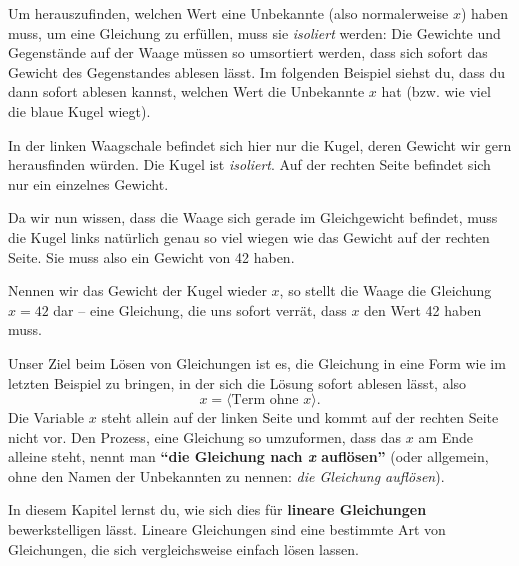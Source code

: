 \documentclass[../../main.tex]{subfiles}
\begin{document}
Um herauszufinden, welchen Wert eine Unbekannte (also normalerweise $x$) haben muss, um eine Gleichung zu erfüllen, muss sie \emph{isoliert} werden: Die Gewichte und Gegenstände auf der Waage müssen so umsortiert werden, dass sich sofort das Gewicht des Gegenstandes ablesen lässt. Im folgenden Beispiel siehst du, dass du dann sofort ablesen kannst, welchen Wert die Unbekannte $x$ hat (bzw. wie viel die blaue Kugel wiegt).

\begin{example}{}
    
    In der linken Waagschale befindet sich hier nur die Kugel, deren Gewicht wir gern herausfinden würden. Die Kugel ist \emph{isoliert}. Auf der rechten Seite befindet sich nur ein einzelnes Gewicht.
    
    Da wir nun wissen, dass die Waage sich gerade im Gleichgewicht befindet, muss die Kugel links natürlich genau so viel wiegen wie das Gewicht auf der rechten Seite. Sie muss also ein Gewicht von 42 haben.
    
    Nennen wir das Gewicht der Kugel wieder $x$, so stellt die Waage die Gleichung $x=42$ dar -- eine Gleichung, die uns sofort verrät, dass $x$ den Wert 42 haben muss.
\end{example}

Unser Ziel beim Lösen von Gleichungen ist es, die Gleichung in eine Form wie im letzten Beispiel zu bringen, in der sich die Lösung sofort ablesen lässt, also
\[x=\langle\text{Term ohne } x\rangle.\]
Die Variable $x$ steht allein auf der linken Seite und kommt auf der rechten Seite nicht vor. Den Prozess, eine Gleichung so umzuformen, dass das $x$ am Ende alleine steht, nennt man \textbf{\enquote{die Gleichung nach \emph{x} auflösen}} (oder allgemein, ohne den Namen der Unbekannten zu nennen: \emph{die Gleichung auflösen}). 

In diesem Kapitel lernst du, wie sich dies für \textbf{lineare Gleichungen} bewerkstelligen lässt. Lineare Gleichungen sind eine bestimmte Art von Gleichungen, die sich vergleichsweise einfach lösen lassen.
\end{document}

